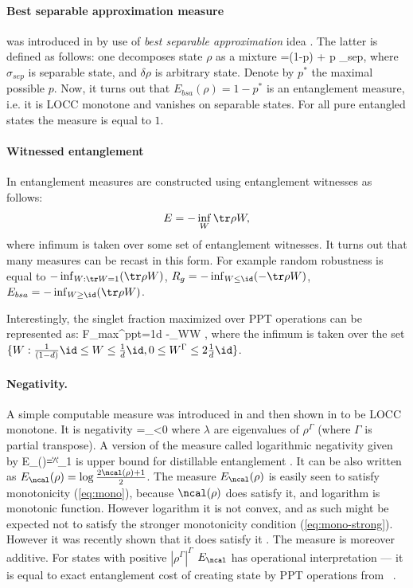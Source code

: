 \documentclass[twocolumn,aps,rmp]{revtex4}
\begin{document}
\paragraph{Best separable approximation measure} was introduced in
\cite{KarnasL2000-bsa} by use of {\it best separable approximation} idea
 \cite{LewensteinSanpera-bsa}. The latter is defined as follows: one  decomposes
state $\rho$  as a mixture
\be
\rho=(1-p) \delta \rho + p \sigma_{sep},
\ee
where $\sigma_{sep}$ is separable state, and $\delta\rho$ is arbitrary state.
Denote by $p^*$ the maximal possible $p$.
Now, it turns out that $E_{bsa}(\rho)=1-p^*$ is an entanglement
measure, i.e. it is LOCC monotone  and vanishes on separable states.
For all pure entangled states the measure is equal to $1$.

\paragraph{Witnessed entanglement}
In \cite{BrandaoV,Brandao2005-witent} entanglement
measures are constructed using entanglement witnesses  as follows:
\begin{equation} E=-\inf_W \tr \rho W, \end{equation} where infimum is taken over some set of
entanglement witnesses. It turns out that many measures can be
recast in this form. For example random robustness is equal
to $-\inf_{W: \tr W=1} (\tr \rho W)$, $R_g=-\inf_{W\leq \id}(-\tr \rho
W)$, $E_{bsa}=-\inf_{W\geq \id} (\tr \rho W)$.

Interestingly, the singlet fraction maximized over PPT operations \cite{Rains2001} can be represented as:
\be
F_{max}^{ppt}={1\over d} -\inf_{W}\tr W \rho,
\ee
where the infimum is taken over the set $\{W: {1\over (1-d)}\id\leq W \leq {1\over d}\id,0\leq W^\Gamma
\leq 2 {1\over d}\id\}$.


\paragraph{Negativity.} A simple computable measure was introduced in
\cite{ZyczkowskiHSP-vol} and then shown in \cite{Vidal-Werner} to be
LOCC monotone. It is negativity
\be
\ncal=\sum_{\lambda<0}\lambda
\ee
where $\lambda$ are eigenvalues of $\rho^\Gamma$ (where $\Gamma$ is
partial transpose). A version of the measure called logarithmic
negativity given by
\be
E_\ncal(\rho)=\log \|\rho^\Gamma\|_1
\ee
is upper bound for distillable entanglement \cite{Vidal-Werner}. It can be also written as $E_\ncal(\rho)= \log {2\ncal(\rho) +1\over 2}$.
The measure $E_\ncal(\rho)$ is easily seen to satisfy monotonicity
(\ref{eq:mono}), because $\ncal(\rho)$ does satisfy it, and
logarithm is monotonic function. However logarithm it is
not convex, and as such might be expected not to satisfy the
stronger monotonicity condition (\ref{eq:mono-strong}). However it
was recently shown that it does satisfy it \cite{Plenio2005-logneg}.
The measure is moreover additive. For states with positive $|\rho^\Gamma|^\Gamma$
$E_\ncal$ has operational interpretation --- it is equal to
exact entanglement cost of creating state by PPT operations from \singlets\
\cite{AudenaertPE2002-PPT}.
\end{document}

